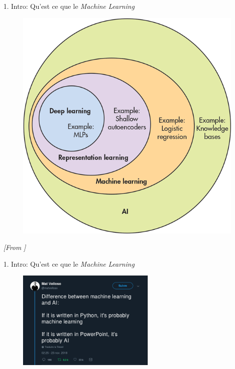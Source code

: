 \begin{frame}{1. Intro: Qu'est ce que le \textit{Machine Learning}}
  \begin{figure}
    \includegraphics[height=0.8\textheight]{fig/aiVennDiagram.png}
  \end{figure}
  \tiny
  \vspace{-1cm}
  \textit{[From \href{http://www.deeplearningbook.org/}{\color{blue}{MIT Press book Deep Learning}}]}
\end{frame}

\begin{frame}{1. Intro: Qu'est ce que le \textit{Machine Learning}}
  \begin{figure}
    \includegraphics[width=0.6\textwidth]{fig/mlvsAI.png}
  \end{figure}
\end{frame}

